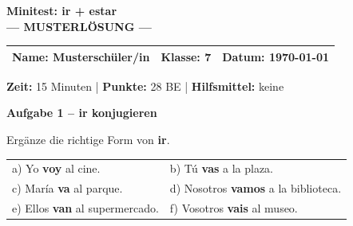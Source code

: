 \documentclass[11pt, a4paper]{article}
\newcommand{\fachfarbe}{spanisch}
\newcommand{\thema}{Minitest: ir + estar}
\newcommand{\klasse}{7}
\newcommand{\maxpunkte}{28}
\newcommand{\zeit}{15 Minuten}
\newcommand{\datum}{\today}
\newcommand{\punktebox}[1]{\hfill\fbox{\small \_\_\_/#1}}
\newcommand{\lsg}[1]{\textcolor{loesung}{\textbf{#1}}}
\newenvironment{aufgabe}[1]{%
    \needspace{5\baselineskip}%
    \nopagebreak[4]%
    \vspace{10pt}
    \noindent\textbf{\textcolor{\fachfarbe}{Aufgabe #1}}
    \nopagebreak[4]%
    \vspace{5pt}
    \nopagebreak[4]%
    \begin{list}{}{\leftmargin=0pt}
    \item[]
}{%
    \end{list}
}
\newcommand{\es}[1]{\textcolor{\fachfarbe}{\textbf{#1}}}
\begin{document}

\begin{center}
    {\Large\bfseries\textcolor{\fachfarbe}{\thema}}\\[0.3em]
    {\large\textcolor{loesung}{\textbf{--- MUSTERLÖSUNG ---}}}
\end{center}

\vspace{5pt}

\noindent
\begin{tabularx}{\textwidth}{|X|X|X|}
\hline
\textbf{Name:} \lsg{Musterschüler/in} &
\textbf{Klasse:} \klasse &
\textbf{Datum:} \datum \\
\hline
\end{tabularx}

\vspace{10pt}

\begin{infobox}
\textbf{Zeit:} \zeit{} | \textbf{Punkte:} \maxpunkte{} BE | \textbf{Hilfsmittel:} keine
\end{infobox}

\vspace{15pt}


\begin{aufgabe}{1 -- ir konjugieren}
Ergänze die richtige Form von \es{ir}. \punktebox{6}
\end{aufgabe}

\noindent
\begin{tabular}{p{}p{}}
a) Yo \lsg{voy} al cine. & b) Tú \lsg{vas} a la plaza. \\[0.8em]
c) María \lsg{va} al parque. & d) Nosotros \lsg{vamos} a la biblioteca. \\[0.8em]
e) Ellos \lsg{van} al supermercado. & f) Vosotros \lsg{vais} al museo. \\
\end{tabular}

\vspace{15pt}

\end{document}
